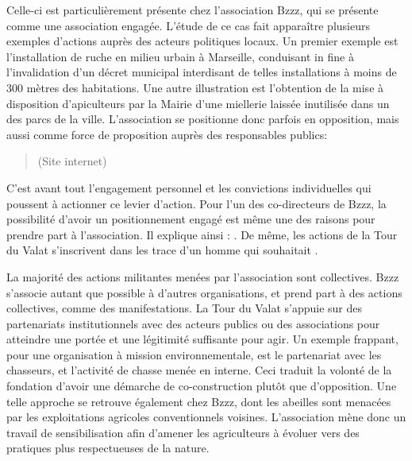         Celle-ci est particulièrement présente chez l'association Bzzz, qui se présente comme une association engagée. L'étude de ce cas fait apparaître plusieurs exemples d'actions auprès des acteurs politiques locaux. Un premier exemple est l'installation de ruche en milieu urbain à Marseille, conduisant in fine à l'invalidation d'un décret municipal interdisant de telles installations à moins de 300 mètres des habitations. Une autre illustration est l'obtention de la mise à disposition d'apiculteurs par la Mairie d'une miellerie laissée inutilisée dans un des parcs de la ville. L'association se positionne donc parfois en opposition, mais aussi comme force de proposition auprès des responsables publics:
        \begin{quotation}
             (Site internet)
        \end{quotation}
    
        
        C'est avant tout l'engagement personnel et les convictions individuelles qui poussent à actionner ce levier d'action. Pour l'un des co-directeurs de Bzzz, la possibilité d'avoir un positionnement engagé est même une des raisons pour prendre part à l'association. Il explique ainsi : . De même, les actions de la Tour du Valat s'inscrivent dans les trace d'un homme qui souhaitait . 
        
        La majorité des actions militantes menées par l'association sont collectives. Bzzz s'associe autant que possible à d'autres organisations, et prend part à des actions collectives, comme des manifestations. La Tour du Valat s'appuie sur des partenariats institutionnels avec des acteurs publics ou des associations pour atteindre une portée et une légitimité suffisante pour agir. Un exemple frappant, pour une organisation à mission environnementale, est le partenariat avec les chasseurs, et l'activité de chasse menée en interne. Ceci traduit la volonté de la fondation d'avoir une démarche de co-construction plutôt que d'opposition. Une telle approche se retrouve également chez Bzzz, dont les abeilles sont menacées par les exploitations agricoles conventionnels voisines. L'association mène donc un travail de sensibilisation afin d'amener les agriculteurs à évoluer vers des pratiques plus respectueuses de la nature.  
       
